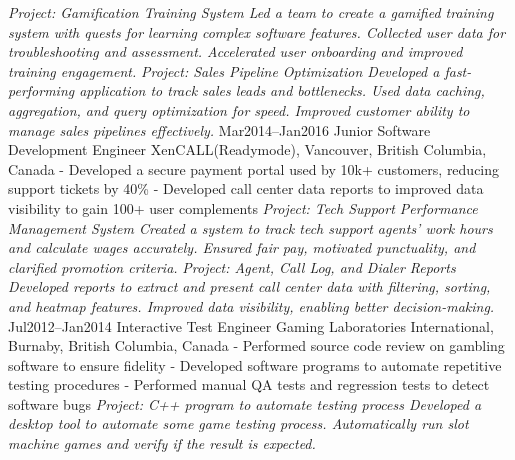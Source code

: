 \documentclass[9pt]{developercv} %
\begin{document}
\begin{entrylist}
{            \textit{Project: Gamification Training System\newline
            Led a team to create a gamified training system with quests for learning complex software features. 
            Collected user data for troubleshooting and assessment. 
            Accelerated user onboarding and improved training engagement. \newline\newline}
            \textit{Project: Sales Pipeline Optimization\newline
            Developed a fast-performing application to track sales leads and bottlenecks. 
            Used data caching, aggregation, and query optimization for speed. 
            Improved customer ability to manage sales pipelines effectively.\newline}
        }
	\entry
		{Mar2014--Jan2016}
		{Junior Software Development Engineer}
		{XenCALL(Readymode), Vancouver, British Columbia, Canada}
		{
            - Developed a secure payment portal used by 10k+ customers, reducing support tickets by 40\%\newline
            - Developed call center data reports to improved data visibility to gain 100+ user complements\newline
            \newline
            \textit{Project: Tech Support Performance Management System\newline
            Created a system to track tech support agents' work hours and calculate wages accurately. 
            Ensured fair pay, motivated punctuality, and clarified promotion criteria.
            \newline\newline}
            \textit{Project: Agent, Call Log, and Dialer Reports\newline
            Developed reports to extract and present call center data with filtering, sorting, and heatmap features. 
            Improved data visibility, enabling better decision-making.\newline}
        }
    \entry
		{Jul2012--Jan2014}
		{Interactive Test Engineer}
		{Gaming Laboratories International, Burnaby, British Columbia, Canada}
		{
            - Performed source code review on gambling software to ensure fidelity\newline
            - Developed software programs to automate repetitive testing procedures\newline
            - Performed manual QA tests and regression tests to detect software bugs\newline\newline
            \textit{Project: C++ program to automate testing process\newline
            Developed a desktop tool to automate some game testing process. 
            Automatically run slot machine games and verify if the result is expected.\newline}
        }
\end{entrylist}
\end{document}
